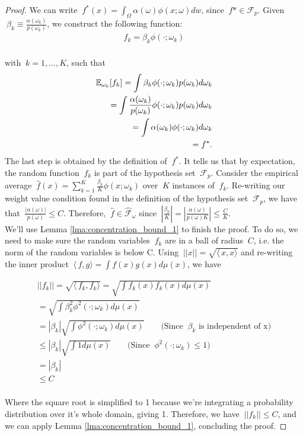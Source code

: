 \documentclass{article}
\begin{document}
\begin{proof}
   We can write $\ f^*(x) = \int_\Omega \alpha(\omega)\phi(x;\omega) dw$, since $\ f* \in \mathcal{F}_p$. Given $\ \beta_k \equiv \frac{\alpha(\omega_k)}{p(\omega_k)}$, we construct the following function:
    \\
    \begin{align*}
        f_k = \beta_k\phi(\cdot;\omega_k) \\
    \end{align*}
    
    with $\ k = 1, ..., K$, such that 
    \begin{align*}
        \mathbb{E}_{\omega_k}[f_k] = \int \beta_k\phi(\cdot;\omega_k)p(\omega_k) d\omega_k \\
        = \int \frac{\alpha(\omega_k)}{p(\omega_k)}\phi(\cdot;\omega_k)p(\omega_k) d\omega_k \\
        = \int \alpha(\omega_k)\phi(\cdot;\omega_k) d\omega_k \\
        = f^*. 
    \end{align*}
    The last step is obtained by the definition of $\ f^*$. It tells us that by expectation, the random function $\ f_k$ is part of the hypothesis set $\ \mathcal{F}_p$. Consider the empirical average $\ \hat{f}(x) = \sum_{k=1}^K \frac{\beta_k}{K}\phi(x;\omega_k)$ over $\ K$ instances of $\ f_k$. Re-writing our weight value condition found in the definition of the hypothesis set $\ \mathcal{F}_p$, we have that $\ \frac{|\alpha(\omega)|}{p(\omega)} \leq C$. Therefore, $\ \hat{f} \in \mathcal{\hat{F}_{\omega}}$ since $\ |\frac{\beta_k}{K}| = |\frac{\alpha(\omega)}{p(\omega)K}| \leq \frac{C}{K}$.
    \\
    
    We'll use Lemma \ref{lma:concentration_bound_1} to finish the proof. To do so, we need to make sure the random variables $\ f_k$ are in a ball of radius $\ C$, i.e. the norm of the random variables is below C. Using $\ ||x|| = \sqrt{\langle\,x,x\rangle}$ and re-writing the inner product $\ \langle\,f,g\rangle = \int f(x)g(x) d\mu(x)$, we have
    
    \begin{align*}
        ||f_k|| = \sqrt{\langle\,f_k,f_k\rangle} = \sqrt{\int f_k(x)f_k(x) d\mu(x)} \\
        = \sqrt{\int \beta_k^2\phi^2(\cdot;\omega_k) d\mu(x)} \\
        = |\beta_k| \sqrt{\int \phi^2(\cdot;\omega_k) d\mu(x)} \quad \quad \text{(Since $\ \beta_k$ is independent of x)} \\
        \leq |\beta_k| \sqrt{\int 1 d\mu(x)} \quad \quad \text{(Since $\ \phi^2(\cdot;\omega_k) \leq 1$)} \\
        = |\beta_k| \\
        \leq C \\
    \end{align*}
    
    Where the square root is simplified to 1 because we're integrating a probability distribution over it's whole domain, giving 1. Therefore, we have $\ ||f_k|| \leq C$, and we can apply Lemma \ref{lma:concentration_bound_1}, concluding the proof.
    
\end{proof}
\end{document}
